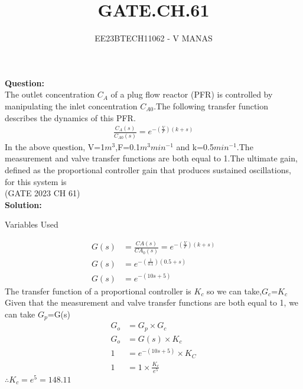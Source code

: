 \documentclass[journal,12pt,twocolumn]{IEEEtran}
\theoremstyle{remark}
\begin{document}

\vspace{3cm}

\title{GATE.CH.61}
\author{EE23BTECH11062 - V MANAS}
\maketitle
\newpage

\bigskip
\textbf{Question:}\\The outlet concentration $C_A$ of a plug flow reactor (PFR) is controlled by manipulating the inlet concentration $C_{A0}$.The following transfer function describes the dynamics of this PFR.
\begin{align*}
    \frac{C_{A}(s)}{C_{A0}(s)}=e^{-(\frac{V}{F})(k+s)}
\end{align*}
In the above question, V=1$m^3$,F=0.1$m^3$$min^{-1}$ and k=0.5$min^{-1}$.The measurement and valve transfer functions are both equal to 1.The ultimate gain, defined as the proportional controller gain that produces sustained oscillations, for this system is\\ \hfill{(GATE 2023 CH 61)}\\
\textbf{Solution:}\\
\begin{table}[h]
    \centering
    
    \caption{Variables Used}
    \label{tab:table_GATE.CH.61}
\end{table}
\begin{align}
    G(s)&=\frac{CA(s)}{CA_0(s)}=e^{-(\frac{V}{F})(k+s)}\\
    G(s)&=e^{-(\frac{1}{0.1})(0.5+s)}\\
    G(s)&=e^{-(10s+5)}
\end{align}
The transfer function of a proportional controller is $K_c$ so we can take,$G_c$=$K_c$\\
Given that the measurement and valve transfer functions are both equal to 1, we can take $G_p$=G(s)
\begin{align}
    G_o&=G_p\times G_c\\
    G_o&=G(s)\times K_c\\
    1&=e^{-(10s+5)}\times K_C\\
    1&=1\times \frac{K_c}{e^5}
\end{align}
$\therefore K_c=e^5=148.11$
\end{document}
